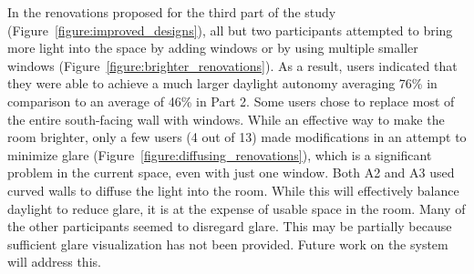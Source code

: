 \documentclass[preprint]{elsarticle}
\begin{document}
In the renovations proposed for the third part of the study
(Figure~\ref{figure:improved_designs}), all but two participants
attempted to bring more light into the space by adding windows or by
using multiple smaller windows
(Figure~\ref{figure:brighter_renovations}).
%
As a result, users indicated that they were able to achieve a much
larger daylight autonomy averaging 76\% in comparison to an average of
46\% 
in Part 2.  Some users chose to replace most of the entire
south-facing wall with windows.  While an effective way to make the
room brighter, only a few users (4 out of 13) made modifications in an
attempt to minimize glare (Figure~\ref{figure:diffusing_renovations}),
which is a significant problem in the current space, even with just
one window.  Both A2 and A3 used curved walls to diffuse the light
into the room.  While this will effectively balance daylight to reduce
glare, it is at the expense of usable space in the room.  
Many of the other participants seemed to disregard glare.  
This may be partially because  sufficient glare
visualization has not been provided.  Future work on the system will address this.






\end{document}
